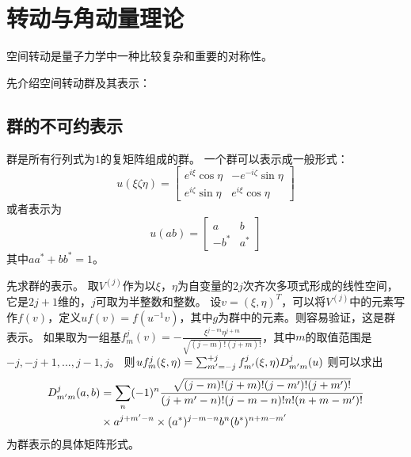 


\section{转动与角动量理论}
空间转动是量子力学中一种比较复杂和重要的对称性。

先介绍空间转动群及其表示：
\subsection{\sutwo 群的不可约表示}
\sutwo 群是所有行列式为1的复矩阵组成的群。
一个\sutwo 群可以表示成一般形式：
\begin{displaymath}
u(\xi\zeta\eta) = \begin{bmatrix}
e^{i\xi}\cos \eta & -e^{-i\zeta} \sin \eta \\ 
e^{i\zeta} \sin \eta & e^{i\xi} \cos \eta
\end{bmatrix} 
\end{displaymath}
或者表示为
\begin{displaymath}
u(ab) = \begin{bmatrix}
a & b \\ 
-b^* & a^* 
\end{bmatrix} 
\end{displaymath}
其中$a a^* + b b^* = 1$。


先求\sutwo 群的表示。
取$V^{(j)}$作为以$\xi$，$\eta$为自变量的$2j$次齐次多项式形成的线性空间，它是$2j+1$维的，$j$可取为半整数和整数。
设$v = (\xi, \eta)^T$，可以将$V^{(j)}$中的元素写作$f(v)$，定义$u f(v) = f(u^{-1}v)$，其中$g$为\sutwo 群中的元素。则容易验证，这是群表示。
如果取为一组基$f^j_m(v) = - \frac{\xi^{j-m}\eta^{j+m}}{\sqrt{(j-m)!(j+m)!}}$，其中$m$的取值范围是$-j,-j+1,...,j-1,j$。
则$u f_m^j(\xi, \eta) = \sum_{{m^{\prime}} = -j}^{+j} f_{{m^{\prime}}}^j(\xi, \eta)D_{{m^{\prime}} m}^j(u)$
则可以求出
\begin{displaymath}
\begin{split}
D^j_{{m^{\prime}} m}(a, b) &= \sum_n (-1)^n \frac{\sqrt{(j-m)!(j+m)!(j-{m^{\prime}})!(j+{m^{\prime}})!}}
{(j+{m^{\prime}}-n)!(j-m-n)!n!(n+m-{m^{\prime}})!} \\
&\times a^{j+{m^{\prime}}-n} \times (a^*)^{j-m-n}b^n(b^*)^{n+m-{m^{\prime}}}
\end{split}
\end{displaymath}
为\sutwo 群表示的具体矩阵形式。

